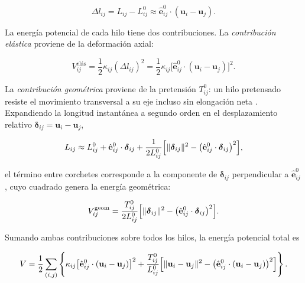\documentclass[11pt,letterpaper]{article}
\begin{document}
\begin{equation}\label{eq:elong}
    \Delta l_{ij}
    = L_{ij} - L^0_{ij}
    \approx \hat{\mathbf{e}}^0_{ij}\cdot(\mathbf{u}_i - \mathbf{u}_j).
\end{equation}

La energía potencial de cada hilo tiene dos contribuciones. La
\emph{contribución elástica} proviene de la deformación axial:

\begin{equation}\label{eq:Velast}
    V^{\text{elás}}_{ij}
    = \frac{1}{2}\kappa_{ij}(\Delta l_{ij})^2
    = \frac{1}{2}\kappa_{ij}
      \bigl[\hat{\mathbf{e}}^0_{ij}\cdot(\mathbf{u}_i-\mathbf{u}_j)\bigr]^2.
\end{equation}

La \emph{contribución geométrica} proviene de la pretensión $T^0_{ij}$:
un hilo pretensado resiste el movimiento transversal a su eje incluso sin
elongación neta \cite{jayaraman1981,wirth2011}. Expandiendo la longitud instantánea a segundo orden en
el desplazamiento relativo $\boldsymbol{\delta}_{ij}=\mathbf{u}_i-\mathbf{u}_j$,

\begin{equation}
    L_{ij}
    \approx L^0_{ij}
    + \hat{\mathbf{e}}^0_{ij}\cdot\boldsymbol{\delta}_{ij}
    + \frac{1}{2L^0_{ij}}
      \Bigl[
          \lVert\boldsymbol{\delta}_{ij}\rVert^2
          - \bigl(\hat{\mathbf{e}}^0_{ij}\cdot\boldsymbol{\delta}_{ij}\bigr)^2
      \Bigr],
\end{equation}

el término entre corchetes corresponde a la componente de
$\boldsymbol{\delta}_{ij}$ perpendicular a $\hat{\mathbf{e}}^0_{ij}$,
cuyo cuadrado genera la energía geométrica:

\begin{equation}\label{eq:Vgeom}
    V^{\text{geom}}_{ij}
    = \frac{T^0_{ij}}{2L^0_{ij}}
      \Bigl[
          \lVert\boldsymbol{\delta}_{ij}\rVert^2
          - \bigl(\hat{\mathbf{e}}^0_{ij}\cdot\boldsymbol{\delta}_{ij}\bigr)^2
      \Bigr].
\end{equation}

Sumando ambas contribuciones sobre todos los hilos, la energía potencial
total es

\begin{equation}\label{eq:V}
    V = \frac{1}{2}\sum_{(i,j)}
    \left\{
        \kappa_{ij}
        \bigl[\hat{\mathbf{e}}^0_{ij}\cdot(\mathbf{u}_i-\mathbf{u}_j)\bigr]^2
        +
        \frac{T^0_{ij}}{L^0_{ij}}
        \Bigl[
            \lVert\mathbf{u}_i-\mathbf{u}_j\rVert^2
            -\bigl(\hat{\mathbf{e}}^0_{ij}
            \cdot(\mathbf{u}_i-\mathbf{u}_j)\bigr)^2
        \Bigr]
    \right\}.
\end{equation}
\end{document}

